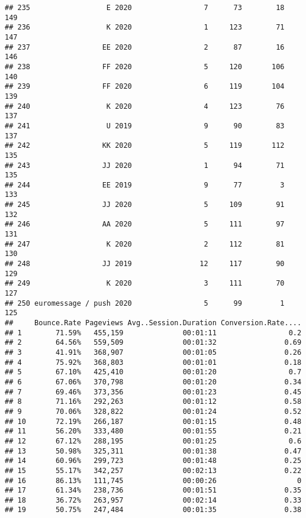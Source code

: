 \documentclass[
]{article}
\begin{document}
\begin{verbatim}
## 235                  E 2020                 7      73        18      149
## 236                  K 2020                 1     123        71      147
## 237                 EE 2020                 2      87        16      146
## 238                 FF 2020                 5     120       106      140
## 239                 FF 2020                 6     119       104      139
## 240                  K 2020                 4     123        76      137
## 241                  U 2019                 9      90        83      137
## 242                 KK 2020                 5     119       112      135
## 243                 JJ 2020                 1      94        71      135
## 244                 EE 2019                 9      77         3      133
## 245                 JJ 2020                 5     109        91      132
## 246                 AA 2020                 5     111        97      131
## 247                  K 2020                 2     112        81      130
## 248                 JJ 2019                12     117        90      129
## 249                  K 2020                 3     111        70      127
## 250 euromessage / push 2020                 5      99         1      125
##     Bounce.Rate Pageviews Avg..Session.Duration Conversion.Rate....
## 1        71.59%   455,159              00:01:11                 0.2
## 2        64.56%   559,509              00:01:32                0.69
## 3        41.91%   368,907              00:01:05                0.26
## 4        75.92%   368,803              00:01:01                0.18
## 5        67.10%   425,410              00:01:20                 0.7
## 6        67.06%   370,798              00:01:20                0.34
## 7        69.46%   373,356              00:01:23                0.45
## 8        71.16%   292,263              00:01:12                0.58
## 9        70.06%   328,822              00:01:24                0.52
## 10       72.19%   266,187              00:01:15                0.48
## 11       56.20%   333,480              00:01:55                0.21
## 12       67.12%   288,195              00:01:25                 0.6
## 13       50.98%   325,311              00:01:38                0.47
## 14       60.96%   299,723              00:01:48                0.25
## 15       55.17%   342,257              00:02:13                0.22
## 16       86.13%   111,745              00:00:26                   0
## 17       61.34%   238,736              00:01:51                0.35
## 18       36.72%   263,957              00:02:14                0.33
## 19       50.75%   247,484              00:01:35                0.38

\end{verbatim}
\end{document}
